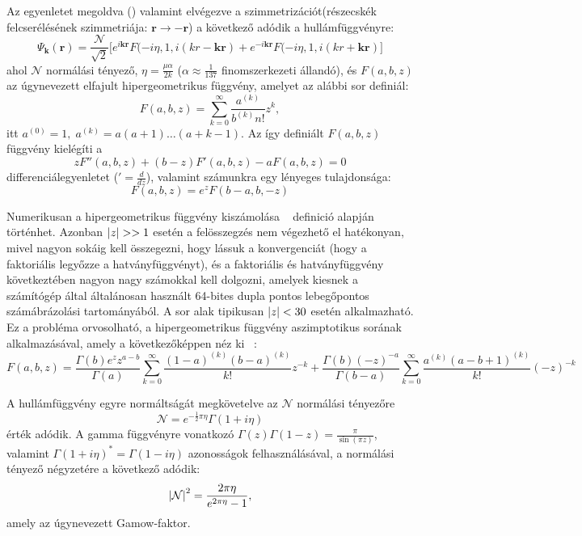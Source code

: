 \documentclass[10pt,a4paper]{article}
\numberwithin{equation}{subsection}
\numberwithin{figure}{section}
\begin{document}
Az egyenletet megoldva (\cite{Landau3}) valamint elvégezve a szimmetrizációt(részecskék felcserélésének szimmetriája: $\bm{r}\rightarrow -\bm{r}$) a következő adódik a hullámfüggvényre:
\begin{equation}
\Psi_{\bm{k}}(\bm{r}) = \frac{\mathcal{N}}{\sqrt{2}}\Big[e^{i\bm{kr}}F(-i\eta, 1, i(kr-\bm{kr})
+e^{-i\bm{kr}}F(-i\eta, 1, i(kr+\bm{kr})\Big]
\end{equation}
ahol $\mathcal{N}$ normálási tényező, $\eta=\frac{\mu\alpha}{2k}$ ($\alpha\approx \frac{1}{137}$ finomszerkezeti állandó), és $F(a,b,z)$ az úgynevezett elfajult hipergeometrikus függvény, amelyet az alábbi sor definiál:
\begin{equation}
F(a,b,z)=\sum_{k=0}^\infty\frac{a^{(k)}}{b^{(k)}n!}z^k,
\label{eq:Fserie}
\end{equation}
itt $a^{(0)}=1,\;a^{(k)}=a(a+1)\dots(a+k-1)$. Az így definiált $F(a,b,z)$ függvény kielégíti a 
\begin{equation}
zF''(a,b,z)+(b-z)F'(a,b,z)-aF(a,b,z)=0
\end{equation}
differenciálegyenletet ($'=\frac{d}{dz}$), valamint számunkra egy lényeges tulajdonsága:
\begin{equation}
F(a,b,z) = e^zF(b-a, b, -z)
\end{equation}

Numerikusan a hipergeometrikus függvény kiszámolása ~ definició alapján történhet. Azonban $\abs{z}>>1$ esetén a felösszegzés nem végezhető el hatékonyan, mivel nagyon sokáig kell összegezni, hogy lássuk a konvergenciát (hogy a faktoriális legyőzze a hatványfüggvényt), és a faktoriális és hatványfüggvény következtében nagyon nagy számokkal kell dolgozni, amelyek kiesnek a számítógép által általánosan használt 64-bites dupla pontos lebegőpontos számábrázolási tartományából. A sor alak tipikusan $\abs{z}<30$ esetén alkalmazható. Ez a probléma orvosolható, a hipergeometrikus függvény aszimptotikus sorának alkalmazásával, amely a következőképpen néz ki ~\cite{NIST:DLMF}:
\begin{equation}
F(a,b,z)=\frac{\Gamma(b)e^zz^{a-b}}{\Gamma(a)}\sum_{k=0}^{\infty}\frac{(1-a)^{(k)}(b-a)^{(k)}}{k!}z^{-k}+\frac{\Gamma(b)(-z)^{-a}}{\Gamma(b-a)}\sum_{k=0}^\infty \frac{a^{(k)}(a-b+1)^{(k)}}{k!}(-z)^{-k}
\end{equation}

A hullámfüggvény egyre normáltságát megkövetelve az $\mathcal{N}$ normálási tényezőre 
\begin{equation}
\mathcal{N}=e^{-\frac{1}{2}\pi\eta}\Gamma(1+i\eta)
\end{equation}
érték adódik. A gamma függvényre vonatkozó $\Gamma(z)\Gamma(1-z)=\frac{\pi}{\sin(\pi z)}$, valamint $\Gamma(1+i\eta)^{*}=\Gamma(1-i\eta)$ azonosságok felhasználásával, a normálási tényező négyzetére a következő adódik:
\begin{equation}
\abs{\mathcal{N}}^2=\frac{2\pi\eta}{e^{2\pi\eta}-1},
\end{equation}
amely az úgynevezett Gamow-faktor.
\end{document}
